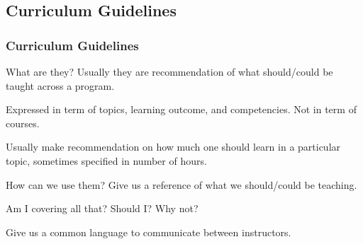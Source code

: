 \documentclass[aspectratio=169]{beamer}
\begin{document}
\subsection{Curriculum Guidelines}


\begin{frame}
  \frametitle{Curriculum Guidelines}

  \begin{block}{What are they?}
    Usually they are recommendation of what should/could be taught across a program.

    Expressed in term of topics, learning outcome, and competencies. Not in term of courses.

    Usually make recommendation on how much one should learn in a
    particular topic, sometimes specified in number of hours.
  \end{block}


  \begin{block}{How can we use them?}
    Give us a reference of what we should/could be teaching.

    Am I covering all that? Should I? Why not?

    Give us a common language to communicate between instructors.
  \end{block}
\end{frame}
\end{document}
